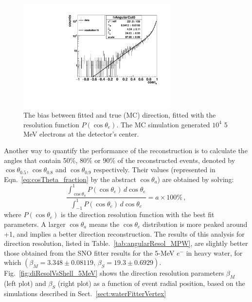 \begin{figure}[htbp]
	\centering
	\includegraphics[width=8cm]{MPW_waterDirection_5MeV.pdf}
	\caption[The bias between the fitted and true (MC) direction.]{The bias between fitted and true (MC) direction, fitted with the resolution function $P(\cos\theta_e)$. The MC simulation generated $10^4$ 5 MeV electrons at the detector's center.\label{fig:directionResol_5MeV}}%
\end{figure}

Another way to quantify the performance of the reconstruction is to calculate the angles that contain 50\%, 80\%
or 90\% of the reconstructed events, denoted by $\cos\theta_{0.5}$, $\cos\theta_{0.8}$ and $\cos\theta_{0.9}$ respectively\cite{coulter2013modelling}. Their values (represented in Eqn.~\ref{eq:cosTheta_fraction} by the abstract $\cos\theta_{a}$) are obtained by solving:
\begin{equation}\label{eq:cosTheta_fraction}
\frac{\int_{\cos\theta_{a}}^1 P(\cos\theta_e) \, d\cos\theta_e}{\int_{-1}^1 P(\cos\theta_e) \, d\cos\theta_e} = a\times 100\% \, ,
\end{equation}
where $P(\cos\theta_e)$ is the direction resolution function with the best fit parameters. A larger $\cos\theta_{a}$ means the $\cos\theta_e$ distribution is more peaked around +1, and implies a better direction reconstruction. The results of this analysis for direction resolution, listed in Table.~\ref{tab:angularResol_MPW}, are slightly better those obtained from the SNO fitter results for the 5-MeV $e^-$ in heavy water, for which \cite{boulay2004direct} $(\beta_M=3.348\pm 0.08119, \, \beta_S=19.3\pm 0.6929)$. Fig.~\ref{fig:diResolVsShell_5MeV} shows the direction resolution parameters $\beta_M$ (left plot) and $\beta_S$ (right plot) as a function of event radial position, based on the simulations described in Sect.~\ref{sect:waterFitterVertex}

